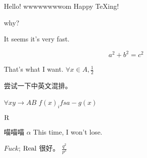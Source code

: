 \documentclass[utf8]{ctexart}
\begin{document}
Hello! wwwwwwwwom
Happy \TeX ing!

why?

It seems it's very fast.

\begin{equation}
    a^2+b^2=c^{2}
\end{equation}

That's what I want.
\(\forall x \in A, \frac{1}{2}\)

尝试一下中英文混排。

\(\forall x y \to AB\)
\(f(x)_{i}  fsa- g(x)\)

\(\rm{R}\)

喵喵喵
\(\alpha\)
This time, I won't lose.

\(Fuck\);
\(\rm Real\)
很好。
\(\frac{q^{2}}{p^{3}}\)
\end{document}
